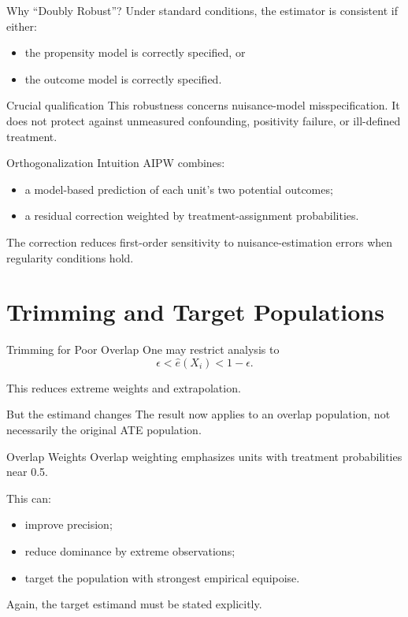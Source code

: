 \documentclass[aspectratio=169,11pt]{beamer}
\begin{document}
\begin{frame}{Why “Doubly Robust”?}
Under standard conditions, the estimator is consistent if either:
\begin{itemize}
\item the propensity model is correctly specified, or
\item the outcome model is correctly specified.
\end{itemize}

\begin{alertblock}{Crucial qualification}
This robustness concerns nuisance-model misspecification. It does not protect against unmeasured confounding, positivity failure, or ill-defined treatment.
\end{alertblock}
\end{frame}

\begin{frame}{Orthogonalization Intuition}
AIPW combines:
\begin{itemize}
\item a model-based prediction of each unit's two potential outcomes;
\item a residual correction weighted by treatment-assignment probabilities.
\end{itemize}

The correction reduces first-order sensitivity to nuisance-estimation errors when regularity conditions hold.
\end{frame}

\section{Trimming and Target Populations}

\begin{frame}{Trimming for Poor Overlap}
One may restrict analysis to
\[
\epsilon
<
\widehat e(X_i)
<
1-\epsilon.
\]

This reduces extreme weights and extrapolation.

\begin{alertblock}{But the estimand changes}
The result now applies to an overlap population, not necessarily the original ATE population.
\end{alertblock}
\end{frame}

\begin{frame}{Overlap Weights}
Overlap weighting emphasizes units with treatment probabilities near 0.5.

This can:
\begin{itemize}
\item improve precision;
\item reduce dominance by extreme observations;
\item target the population with strongest empirical equipoise.
\end{itemize}

Again, the target estimand must be stated explicitly.
\end{frame}
\end{document}
